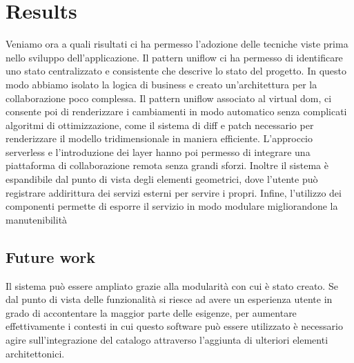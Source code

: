 \section{Results}\label{sec:results}

Veniamo ora a quali risultati ci ha permesso l'adozione delle tecniche viste prima nello sviluppo dell'applicazione. Il pattern uniflow ci ha permesso di identificare uno stato centralizzato e consistente che descrive lo stato del progetto. In questo modo abbiamo isolato la logica di business e creato un'architettura per la collaborazione poco complessa. Il pattern uniflow associato al virtual dom, ci consente poi di renderizzare i cambiamenti in modo automatico senza complicati algoritmi di ottimizzazione, come il sistema di diff e patch necessario per renderizzare il modello tridimensionale in maniera efficiente. L'approccio serverless e l'introduzione dei layer hanno poi permesso di integrare una piattaforma di collaborazione remota senza grandi sforzi. Inoltre il sistema è espandibile dal punto di vista degli elementi geometrici, dove l'utente pu\`o registrare addirittura dei servizi esterni per servire i propri. Infine, l'utilizzo dei componenti permette di esporre il servizio in modo modulare migliorandone la manutenibilit\`a



\subsection{Future work}
Il sistema pu\`o essere ampliato grazie alla modularit\`a con cui \`e stato creato. Se dal punto di vista delle funzionalit\`a si riesce ad avere un esperienza utente in grado di accontentare la maggior parte delle esigenze, per aumentare effettivamente i contesti in cui questo software pu\`o essere utilizzato \`e necessario agire sull'integrazione del catalogo attraverso l'aggiunta di ulteriori elementi architettonici.